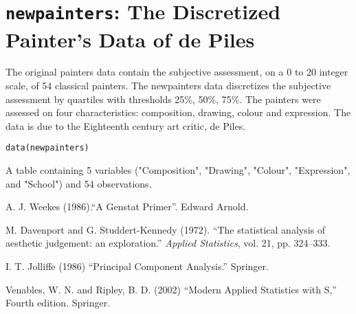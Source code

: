  \section{{\tt newpainters}: The Discretized Painter's Data of de Piles}\label{ss:newpainters}
\begin{Description}\relax
The original painters data contain the subjective assessment, 
on a 0 to 20 integer scale, of 54 classical painters. The
newpainters data discretizes the subjective assessment by
quartiles with thresholds 25\%, 50\%, 75\%. The painters were 
assessed on four characteristics: composition, drawing, 
colour and expression.  The data is due to the Eighteenth century 
art critic, de Piles.
\end{Description}
\begin{Usage}
\begin{verbatim}data(newpainters)\end{verbatim}
\end{Usage}
\begin{Format}\relax
A table containing 5 variables ("Composition", "Drawing", "Colour", 
"Expression", and "School") and 54 observations.
\end{Format}
\begin{Source}\relax
A. J. Weekes (1986).``A Genstat Primer''. Edward Arnold.

M. Davenport and G. Studdert-Kennedy (1972). ``The statistical
analysis of aesthetic judgement: an exploration.'' \emph{Applied
Statistics}, vol. 21,  pp. 324--333.

I. T. Jolliffe (1986) ``Principal Component Analysis.'' Springer.
\end{Source}
\begin{References}\relax
Venables, W. N. and Ripley, B. D. (2002) ``Modern Applied
Statistics with S,'' Fourth edition.  Springer.
\end{References}


